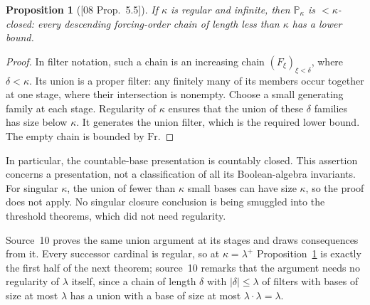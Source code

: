 \documentclass[11pt,letterpaper]{article}
\newtheorem{proposition}[theorem]{Proposition}
\theoremstyle{definition}
\theoremstyle{remark}
\newcommand{\Fr}{\mathrm{Fr}}
\newcommand{\PP}{\mathbb P}
\newcommand{\src}[1]{\textup{[#1]}}
\begin{document}
\begin{proposition}[\src{08 Prop.~5.5}]\label{fbc:prop:closure}
If $\kappa$ is regular and infinite, then $\PP_\kappa$ is
$<\kappa$-closed: every descending forcing-order chain of length
less than $\kappa$ has a lower bound.
\end{proposition}
\begin{proof}
In filter notation, such a chain is an increasing chain
$(F_\xi)_{\xi<\delta}$, where $\delta<\kappa$. Its union is a
proper filter: any finitely many of its members occur together at
one stage, where their intersection is nonempty. Choose a small
generating family at each stage. Regularity of $\kappa$ ensures
that the union of these $\delta$ families has size below $\kappa$.
It generates the union filter, which is the required lower bound.
The empty chain is bounded by $\Fr$.
\end{proof}

In particular, the countable-base presentation is countably closed.
This assertion concerns a presentation, not a classification of all
its Boolean-algebra invariants. For singular $\kappa$, the union of
fewer than $\kappa$ small bases can have size $\kappa$, so the proof
does not apply. No singular closure conclusion is being smuggled into
the threshold theorems, which did not need regularity.

Source~10 proves the same union argument at its stages and draws
consequences from it. Every successor cardinal is regular, so at
$\kappa=\lambda^+$ Proposition~\ref{fbc:prop:closure} is exactly the
first half of the next theorem; source~10 remarks that the argument
needs no regularity of $\lambda$ itself, since a chain of length
$\delta$ with $|\delta|\leq\lambda$ of filters with bases of size at most
$\lambda$ has a union with a base of size at most
$\lambda\cdot\lambda=\lambda$.
\end{document}
